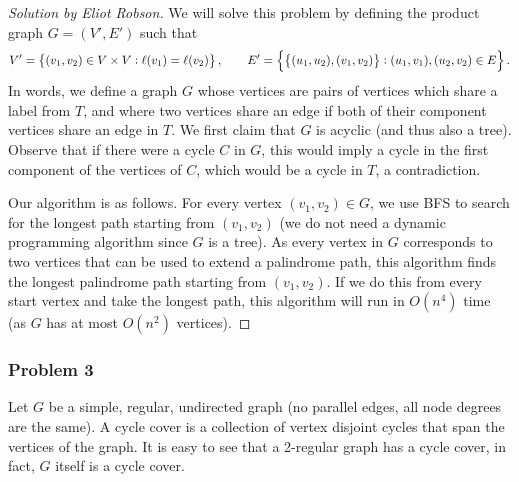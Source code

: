 \documentclass{article}
\newenvironment{solution}[1]{\begin{proof}[Solution by #1]}{\end{proof}}
\begin{document}
\begin{solution}{Eliot Robson}
    We will solve this problem by defining the product graph \(G = (V', E')\) such that
    \[
        V' = \set{(v_1, v_2) \in V \times V : \ell(v_1) = \ell(v_2)},
        \qquad
        E' = \set{\set{(u_1, u_2), (v_1, v_2)} : (u_1, v_1), (u_2, v_2) \in E}.
    \]
    In words, we define a graph \(G\) whose vertices are pairs of vertices which share a label from \(T\), and where two vertices share an edge if both of their component vertices share an edge in \(T\). We first claim that \(G\) is acyclic (and thus also a tree). Observe that if there were a cycle \(C\) in \(G\), this would imply a cycle in the first component of the vertices  of \(C\), which would be a cycle in \(T\), a contradiction.
    
    Our algorithm is as follows. For every vertex \((v_1, v_2) \in G\), we use BFS to search for the longest path starting from \((v_1, v_2)\) (we do not need a dynamic programming algorithm since \(G\) is a tree). As every vertex in \(G\) corresponds to two vertices that can be used to extend a palindrome path, this algorithm finds the longest palindrome path starting from \((v_1, v_2)\). If we do this from every start vertex and take the longest path, this algorithm will run in \(O(n^4)\) time (as \(G\) has at most \(O(n^2)\) vertices).
\end{solution}

\subsubsection{Problem 3}
Let \(G\) be a simple, regular, undirected graph (no parallel edges, all node degrees are the same). A cycle cover is a collection of vertex disjoint cycles that span the vertices of the graph. It is easy to see that a 2-regular graph has a cycle cover, in fact, \(G\) itself is a cycle cover.
\end{document}
